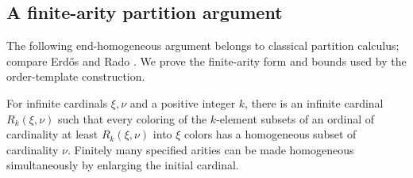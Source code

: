 \subsection{A finite-arity partition argument}

The following end-homogeneous argument belongs to classical partition
calculus; compare Erd\H{o}s and Rado
\cite[Theorem~39 and its corollary]{ErdosRado1956}.  We prove the
finite-arity form and bounds used by the order-template construction.

\begin{lemma}
\label{found:partition}
For infinite cardinals $\xi,\nu$ and a positive integer $k$, there is
an infinite cardinal $R_k(\xi,\nu)$ such that every coloring of the
$k$-element subsets of an ordinal of cardinality at least
$R_k(\xi,\nu)$ into $\xi$ colors has a homogeneous subset of
cardinality $\nu$. Finitely many specified arities can be made
homogeneous simultaneously by enlarging the initial cardinal.
\end{lemma}

